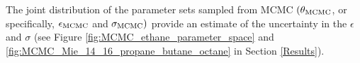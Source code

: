 \documentclass[preprint,letterpaper,floatfix,citeautoscript,aip,jcp]{revtex4-1}
\begin{document}
The 
joint distribution of the
parameter sets sampled from MCMC $(\theta_{\rm MCMC}$, or specifically, $\epsilon_{\rm MCMC}$ and $\sigma_{\rm MCMC})$ provide an estimate of the uncertainty in the $\epsilon$ and $\sigma$ (see Figure \ref{fig:MCMC_ethane_parameter_space} and \ref{fig:MCMC_Mie_14_16_propane_butane_octane} in Section \ref{Results}). 
%
\end{document}
